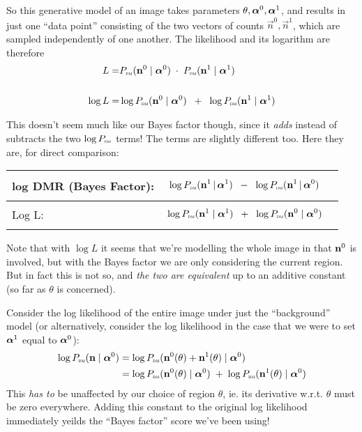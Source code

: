 \documentclass[12pt]{article}
\begin{document}
So this generative model of an image takes parameters $\theta,
\boldsymbol\alpha^0, \boldsymbol\alpha^1$, and results in just one ``data point''
consisting of the two vectors of counts $\vec{n}^0,\vec{n}^1$, which are sampled independently of one another.  The
likelihood and its logarithm are therefore
\begin{align*}
L =& P_\text{\tiny\sc dm}(\mathbf{n}^0 \mid \boldsymbol\alpha^0) \; \cdot \; P_\text{\tiny\sc dm}(\mathbf{n}^1 \mid \boldsymbol\alpha^1) 
\\ \\
\log L =& \log P_\text{\tiny\sc dm}(\mathbf{n}^0 \mid \boldsymbol\alpha^0) \;\; + \;\; \log P_\text{\tiny\sc dm}(\mathbf{n}^1 \mid \boldsymbol\alpha^1) 
\end{align*}

This doesn't seem much like our Bayes factor though, since it
\emph{adds} instead of subtracts the two $\log P_\text{\tiny\sc dm}$ terms! The terms
are slightly different too.  Here they are, for direct comparison:

\begin{tabular}{|l|l|}
\hline
log DMR (Bayes Factor): & 
\parbox{.7\textwidth}{
\begin{align*}
&\log P_\text{\tiny\sc dm}(\mathbf{n}^1 \,|\, \boldsymbol\alpha^1) \;\;-\;\; \log P_\text{\tiny\sc dm}(\mathbf{n}^1 \,|\, \boldsymbol\alpha^0)
\end{align*}
} \\
\hline
Log L: & 
\parbox{.7\textwidth}{
\begin{align*}
& \log P_\text{\tiny\sc dm}(\mathbf{n}^1 \mid \boldsymbol\alpha^1) \;\; + \;\; \log P_\text{\tiny\sc dm}(\mathbf{n}^0 \mid \boldsymbol\alpha^0)
\end{align*}
} \\
\hline
\end{tabular}

Note that with $\log L$ it seems that we're modelling the whole image
in that $\mathbf{n}^0$ is involved, but with the Bayes factor we are only
considering the current region. But in fact this is not so, and {\it
  the two are equivalent} up to an additive constant (so far as
$\theta$ is concerned).

Consider the log likelihood of the entire image under just the
``background'' model (or alternatively, consider the log likelihood in the case that we were to set $\boldsymbol\alpha^1$ equal to $\boldsymbol\alpha^0$):
\begin{align*}
\log P_\text{\tiny\sc dm}(\mathbf{n} \mid \boldsymbol\alpha^0) 
&= \log P_\text{\tiny\sc dm}(\mathbf{n}^0(\theta) + \mathbf{n}^1(\theta) \mid \boldsymbol\alpha^0)  \\
&= \log P_\text{\tiny\sc dm}(\mathbf{n}^0(\theta) \mid \boldsymbol\alpha^0) \; + \; \log P_\text{\tiny\sc dm}(\mathbf{n}^1(\theta) \mid \boldsymbol\alpha^0) 
\end{align*}
This \emph{has to} be unaffected by our choice of region $\theta$,
ie. its derivative w.r.t. $\theta$ must be zero everywhere.  Adding
this constant to the original log likelihood immediately yeilds the
``Bayes factor'' score we've been using!
\end{document}
